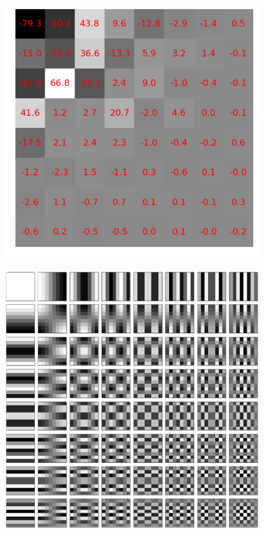 \documentclass{beamer}
\begin{document}
\begin{frame}
    \includegraphics[scale=0.2]{fig/8x8random_dct.png}
\end{frame}

\begin{frame}
    \begin{center}
        \includegraphics[scale=0.4]{fig/dctbase.png}
    \end{center}
\end{frame}
\end{document}
